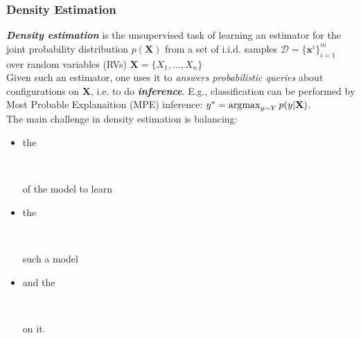 \documentclass[xcolor={usenames,dvipsnames,svgnames}, compress]{beamer}
\newcommand{\argmax}{\operatornamewithlimits{argmax}}
\newcommand{\highlighttext}[2][yellow]{{\colorbox{#1}{\strut\textcolor{white}{#2}}}}
\begin{document}
\begin{frame}[t]
  \frametitle{Density Estimation}
  \small
  \emph{\textbf{Density estimation}} is the unsupervised task of
    learning an estimator for the joint probability distribution
    $p(\mathbf{X})$ from a set of i.i.d. samples $\mathcal{D}=\{\mathbf
    x^i\}_{i=1}^m$ over random variables (RVs) $\mathbf{X}=\{X_{1},\dots,X_{n}\}$\\[17pt]
    
    Given such an estimator, one uses it to \emph{answers
    probabilistic queries} about configurations on $\mathbf{X}$,
  i.e. to do \emph{\textbf{inference}}.
  E.g., classification can be performed by Most Probable Explanaition
  (MPE) inference: $y^{*}=\argmax_{y\sim Y}p(y|\mathbf{X})$.
  \\[17pt]

    The main challenge in density estimation is balancing:
    \begin{itemize}
      \setlength\itemsep{-3pt}
    \item the \highlighttext[lacamlilac]{\textbf{\emph{representation
            expressiveness}}} of the model to learn
    \item the \highlighttext[gold4]{\textbf{\emph{cost of learning}}}
      such a model
      \item and the \highlighttext[petroil2]{\textbf{\emph{cost of performing inference}}} on it.
    \end{itemize}

\end{frame}
\end{document}
